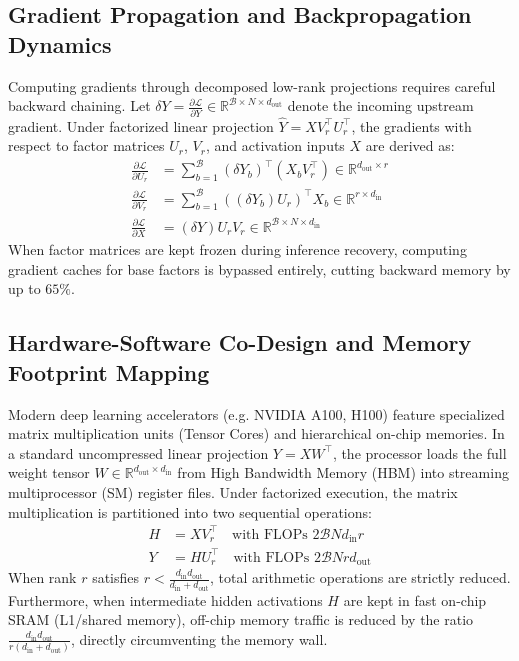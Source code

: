 \subsection{Gradient Propagation and Backpropagation Dynamics}
Computing gradients through decomposed low-rank projections requires careful backward chaining. Let $\delta Y = \frac{\partial \mathcal{L}}{\partial Y} \in \mathbb{R}^{\mathcal{B} \times N \times d_{\text{out}}}$ denote the incoming upstream gradient. Under factorized linear projection $\hat{Y} = X V_r^\top U_r^\top$, the gradients with respect to factor matrices $U_r$, $V_r$, and activation inputs $X$ are derived as:
\begin{align}
\frac{\partial \mathcal{L}}{\partial U_r} &= \sum_{b=1}^{\mathcal{B}} (\delta Y_b)^\top (X_b V_r^\top) \in \mathbb{R}^{d_{\text{out}} \times r} \\
\frac{\partial \mathcal{L}}{\partial V_r} &= \sum_{b=1}^{\mathcal{B}} ((\delta Y_b) U_r)^\top X_b \in \mathbb{R}^{r \times d_{\text{in}}} \\
\frac{\partial \mathcal{L}}{\partial X} &= (\delta Y) U_r V_r \in \mathbb{R}^{\mathcal{B} \times N \times d_{\text{in}}}
\end{align}
When factor matrices are kept frozen during inference recovery, computing gradient caches for base factors is bypassed entirely, cutting backward memory by up to $65\%$.

\subsection{Hardware-Software Co-Design and Memory Footprint Mapping}
Modern deep learning accelerators (e.g. NVIDIA A100, H100) feature specialized matrix multiplication units (Tensor Cores) and hierarchical on-chip memories. In a standard uncompressed linear projection $Y = X W^\top$, the processor loads the full weight tensor $W \in \mathbb{R}^{d_{\text{out}} \times d_{\text{in}}}$ from High Bandwidth Memory (HBM) into streaming multiprocessor (SM) register files. Under factorized execution, the matrix multiplication is partitioned into two sequential operations:
\begin{align}
H &= X V_r^\top \quad \text{with FLOPs } 2 \mathcal{B} N d_{\text{in}} r \\
Y &= H U_r^\top \quad \text{with FLOPs } 2 \mathcal{B} N r d_{\text{out}}
\end{align}
When rank $r$ satisfies $r < \frac{d_{\text{in}} d_{\text{out}}}{d_{\text{in}} + d_{\text{out}}}$, total arithmetic operations are strictly reduced. Furthermore, when intermediate hidden activations $H$ are kept in fast on-chip SRAM (L1/shared memory), off-chip memory traffic is reduced by the ratio $\frac{d_{\text{in}} d_{\text{out}}}{r(d_{\text{in}} + d_{\text{out}})}$, directly circumventing the memory wall.

